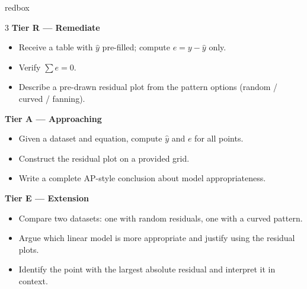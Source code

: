 \documentclass[10pt]{article}
\begin{document}
\begin{skillbox}{redbox}
\begin{multicols}{3}
\textbf{Tier R --- Remediate}
\begin{itemize}
    \item Receive a table with $\hat{y}$ pre-filled; compute $e = y - \hat{y}$ only.
    \item Verify $\sum e = 0$.
    \item Describe a pre-drawn residual plot from the pattern options (random / curved /
          fanning).
\end{itemize}

\columnbreak

\textbf{Tier A --- Approaching}
\begin{itemize}
    \item Given a dataset and equation, compute $\hat{y}$ and $e$ for all points.
    \item Construct the residual plot on a provided grid.
    \item Write a complete AP-style conclusion about model appropriateness.
\end{itemize}

\columnbreak

\textbf{Tier E --- Extension}
\begin{itemize}
    \item Compare two datasets: one with random residuals, one with a curved pattern.
    \item Argue which linear model is more appropriate and justify using the residual plots.
    \item Identify the point with the largest absolute residual and interpret it in context.
\end{itemize}
\end{multicols}
\end{skillbox}
\end{document}
